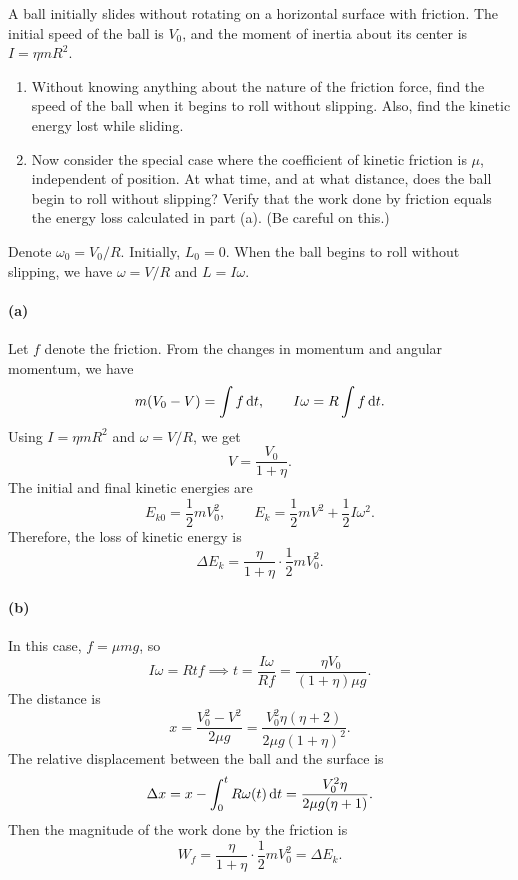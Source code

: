 \documentclass{article}
\begin{document}
\Needspace{8cm}
\begin{problem}
A ball initially slides without rotating on a horizontal surface with friction. The initial speed of the ball is $V_0$, and the moment of inertia about its center is $I=\eta mR^2$.
\begin{enumerate}
  \item[(a)] Without knowing anything about the nature of the friction force, find the speed of the ball when it begins to roll without slipping. Also, find the kinetic energy lost while sliding.
  \item[(b)] Now consider the special case where the coefficient of kinetic friction is $\mu$, independent of position. At what time, and at what distance, does the ball begin to roll without slipping? Verify that the work done by friction equals the energy loss calculated in part (a). (Be careful on this.)
\end{enumerate}
\begin{center}
  
\end{center}
\end{problem}

\begin{solution}
	Denote $\omega_0 = V_0/R$. Initially, $L_0 = 0$. When the ball begins to roll without slipping, we have $\omega = V/R$ and $L = I\omega$.

	\paragraph{(a)} Let $f$ denote the friction. From the changes in momentum and angular momentum, we have
	\[ m(V_0 - V) = \int f \,\mathrm{d} t, \qquad I\omega = R\int f \,\mathrm{d} t. \]
	Using $I = \eta mR^2$ and $\omega = V/R$, we get
	\[ V = \frac{V_0}{1 + \eta}. \]
	The initial and final kinetic energies are
	\[ E_{k0} = \frac{1}{2}mV_0^2, \qquad E_k = \frac{1}{2}mV^2 + \frac{1}{2}I\omega^2. \]
	Therefore, the loss of kinetic energy is
	\[ \Delta E_k = \frac{\eta}{1 + \eta} \cdot \frac{1}{2}mV_0^2. \]

	\paragraph{(b)} In this case, $f = \mu mg$, so
	\[ I\omega = Rtf \implies t = \frac{I\omega}{Rf} = \frac{\eta V_0}{(1 + \eta)\mu g}. \]
	The distance is
	\[ x = \frac{V_0^2 - V^2}{2\mu g} = \frac{V_0^2\eta(\eta + 2)}{2\mu g(1 + \eta)^2}. \]
	The relative displacement between the ball and the surface is
	\[ \Delta x = x - \int_0^t R\omega(t)\,\mathrm{d} t = \frac{V_0^2\eta}{2\mu g(\eta + 1)}. \]
	Then the magnitude of the work done by the friction is
	\[ W_f = \frac{\eta}{1 + \eta} \cdot \frac{1}{2}mV_0^2 = \Delta E_k. \]
\end{solution}
\end{document}
